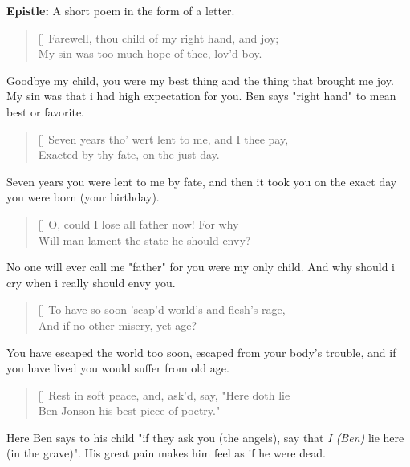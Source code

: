 \documentclass[12pt, a4paper]{article}
\begin{document}
\textbf{Epistle:} A short poem in the form of a letter.




\settowidth{\versewidth}{Farewell, thou child of my right hand, and joy}
\begin{verse}[\versewidth]
{\fontverse
Farewell, thou child of my right hand, and joy;\\
My sin was too much hope of thee, lov'd boy. 
}
\end{verse}

Goodbye my child, you were my best thing and the thing that brought me joy.
My sin was that i had high expectation for you. Ben says "right 
hand" to mean best or favorite.

\begin{verse}[\versewidth]
{\fontverse
Seven years tho' wert lent to me, and I thee pay, \\
Exacted by thy fate, on the just day. 
}
\end{verse}

Seven years you were lent to me by fate, and then it took you on the 
exact day you were born (your birthday).

\begin{verse}[\versewidth]
{\fontverse
O, could I lose all father now! For why \\
Will man lament the state he should envy? 
}
\end{verse}

No one will ever call me "father" for you were my only child.
And why should i cry when i really should envy you.

\begin{verse}[\versewidth]
{\fontverse
To have so soon 'scap'd world's and flesh's rage, \\
And if no other misery, yet age?
}
\end{verse}

You have escaped the world too soon, escaped from your
body's trouble, and if you have lived you would suffer from old age.\bigbreak

\begin{verse}[\versewidth]
{\fontverse
Rest in soft peace, and, ask'd, say, "Here doth lie \\
Ben Jonson his best piece of poetry." 
}
\end{verse}

Here Ben says to his child "if they ask you (the angels), say that 
\textit{I (Ben)} lie here (in the grave)". His great pain makes him
feel as if he were dead.
\end{document}

